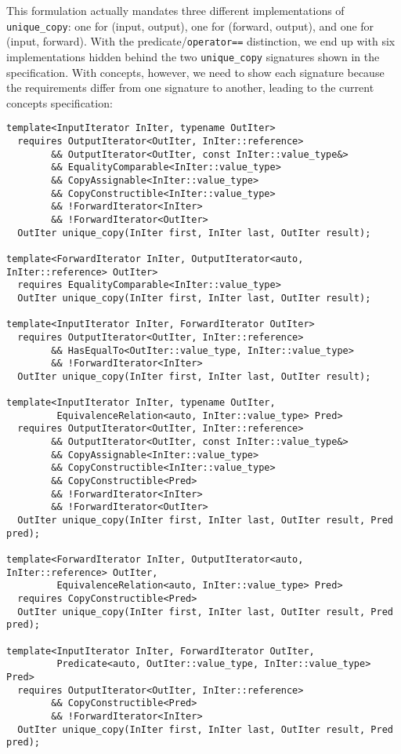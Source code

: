 \documentclass[american]{article}
\newcommand{\code}[1]{\lstinline[basicstyle=\sffamily,keywords={}]{#1}}
\newcommand{\tcode}[1]{\code{#1}}
\begin{document}
This formulation actually mandates three different implementations of
\tcode{unique_copy}: one for (input, output), one for (forward, output), and one
for (input, forward). With the predicate/\tcode{operator==} distinction, we end
up with six implementations hidden behind the two \tcode{unique_copy} signatures
shown in the specification. With concepts, however, we need to show each
signature because the requirements differ from one signature to another, leading
to the current concepts specification:

\begin{lstlisting}
template<InputIterator InIter, typename OutIter>
  requires OutputIterator<OutIter, InIter::reference>
        && OutputIterator<OutIter, const InIter::value_type&>
        && EqualityComparable<InIter::value_type> 
        && CopyAssignable<InIter::value_type>
        && CopyConstructible<InIter::value_type> 
        && !ForwardIterator<InIter> 
        && !ForwardIterator<OutIter>
  OutIter unique_copy(InIter first, InIter last, OutIter result);

template<ForwardIterator InIter, OutputIterator<auto, InIter::reference> OutIter>
  requires EqualityComparable<InIter::value_type>
  OutIter unique_copy(InIter first, InIter last, OutIter result);

template<InputIterator InIter, ForwardIterator OutIter>
  requires OutputIterator<OutIter, InIter::reference> 
        && HasEqualTo<OutIter::value_type, InIter::value_type>
        && !ForwardIterator<InIter>
  OutIter unique_copy(InIter first, InIter last, OutIter result);

template<InputIterator InIter, typename OutIter,
         EquivalenceRelation<auto, InIter::value_type> Pred>
  requires OutputIterator<OutIter, InIter::reference>
        && OutputIterator<OutIter, const InIter::value_type&>
        && CopyAssignable<InIter::value_type> 
        && CopyConstructible<InIter::value_type> 
        && CopyConstructible<Pred>
        && !ForwardIterator<InIter> 
        && !ForwardIterator<OutIter>
  OutIter unique_copy(InIter first, InIter last, OutIter result, Pred pred);

template<ForwardIterator InIter, OutputIterator<auto, InIter::reference> OutIter,
         EquivalenceRelation<auto, InIter::value_type> Pred>
  requires CopyConstructible<Pred>
  OutIter unique_copy(InIter first, InIter last, OutIter result, Pred pred);

template<InputIterator InIter, ForwardIterator OutIter,
         Predicate<auto, OutIter::value_type, InIter::value_type> Pred>
  requires OutputIterator<OutIter, InIter::reference> 
        && CopyConstructible<Pred>
        && !ForwardIterator<InIter>
  OutIter unique_copy(InIter first, InIter last, OutIter result, Pred pred);
\end{lstlisting}
\end{document}
